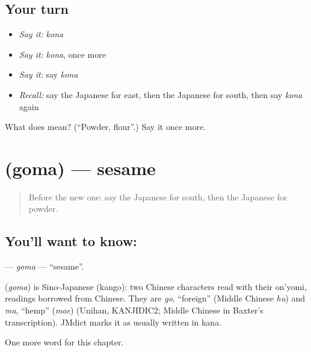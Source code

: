 \subsection*{Your turn}
\begin{itemize}
\raggedright
  \item \emph{Say it:} \emph{kona}
  \item \emph{Say it:} \emph{kona}, once more
  \item \emph{Say it:} say \emph{kona}
  \item \emph{Recall:} say the Japanese for east, then the Japanese for south, then say \emph{kona} again
\end{itemize}

\begin{tcolorbox}[breakable,colback=teal!4,colframe=teal!35!black,title={Before you move on}]
What does  mean? (\textquotedblleft{}Powder, flour\textquotedblright{}.) Say it once more.
\end{tcolorbox}
\section[\texorpdfstring{\ja{ごま} (goma)}{ごま (goma)}]{ (goma) — sesame}

\label{lesson:JA-C64-goma}



\begin{quote}
Before the new one: say the Japanese for south, then the Japanese for powder.
\end{quote}

\subsection*{You'll want to know: }
\textbf{} — \emph{goma} — \textquotedblleft{}sesame\textquotedblright{}.

\begin{cousinweb}
\textbf{} (\emph{goma}) is Sino-Japanese (kango): two Chinese characters read with their on'yomi, readings borrowed from Chinese. They are \emph{go}, \textquotedblleft{}foreign\textquotedblright{} (Middle Chinese \emph{hu}) and \emph{ma}, \textquotedblleft{}hemp\textquotedblright{} (\emph{mae}) (Unihan, KANJIDIC2; Middle Chinese in Baxter's transcription). JMdict marks it as usually written in kana.
\end{cousinweb}

\begin{grammarlens}[title={What you've built}]
One more word for this chapter.
\end{grammarlens}

